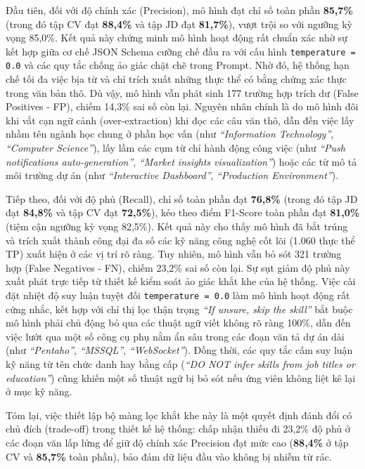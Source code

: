 Đầu tiên, đối với độ chính xác (Precision), mô hình đạt chỉ số toàn phần \textbf{85,7\%} (trong đó tập CV đạt \textbf{88,4\%} và tập JD đạt \textbf{81,7\%}), vượt trội so với ngưỡng kỳ vọng 85,0\%. Kết quả này chứng minh mô hình hoạt động rất chuẩn xác nhờ sự kết hợp giữa cơ chế JSON Schema cưỡng chế đầu ra với cấu hình \texttt{temperature = 0.0} và các quy tắc chống ảo giác chặt chẽ trong Prompt. Nhờ đó, hệ thống hạn chế tối đa việc bịa từ và chỉ trích xuất những thực thể có bằng chứng xác thực trong văn bản thô. Dù vậy, mô hình vẫn phát sinh 177 trường hợp trích dư (False Positives - FP), chiếm 14,3\% sai số còn lại. Nguyên nhân chính là do mô hình đôi khi vắt cạn ngữ cảnh (over-extraction) khi đọc các câu văn thô, dẫn đến việc lấy nhầm tên ngành học chung ở phần học vấn (như \textit{``Information Technology''}, \textit{``Computer Science''}), lấy lầm các cụm từ chỉ hành động công việc (như \textit{``Push notifications auto-generation''}, \textit{``Market insights visualization''}) hoặc các từ mô tả môi trường dự án (như \textit{``Interactive Dashboard''}, \textit{``Production Environment''}).

Tiếp theo, đối với độ phủ (Recall), chỉ số toàn phần đạt \textbf{76,8\%} (trong đó tập JD đạt \textbf{84,8\%} và tập CV đạt \textbf{72,5\%}), kéo theo điểm F1-Score toàn phần đạt \textbf{81,0\%} (tiệm cận ngưỡng kỳ vọng 82,5\%). Kết quả này cho thấy mô hình đã bắt trúng và trích xuất thành công đại đa số các kỹ năng công nghệ cốt lõi (1.060 thực thể TP) xuất hiện ở các vị trí rõ ràng. Tuy nhiên, mô hình vẫn bỏ sót 321 trường hợp (False Negatives - FN), chiếm 23,2\% sai số còn lại. Sự sụt giảm độ phủ này xuất phát trực tiếp từ thiết kế kiểm soát ảo giác khắt khe của hệ thống. Việc cài đặt nhiệt độ suy luận tuyệt đối \texttt{temperature = 0.0} làm mô hình hoạt động rất cứng nhắc, kết hợp với chỉ thị lọc thận trọng \textit{``If unsure, skip the skill''} bắt buộc mô hình phải chủ động bỏ qua các thuật ngữ viết không rõ ràng 100\%, dẫn đến việc lướt qua một số công cụ phụ nằm ẩn sâu trong các đoạn văn tả dự án dài (như \textit{``Pentaho''}, \textit{``MSSQL''}, \textit{``WebSocket''}). Đồng thời, các quy tắc cấm suy luận kỹ năng từ tên chức danh hay bằng cấp (\textit{``DO NOT infer skills from job titles or education''}) cũng khiến một số thuật ngữ bị bỏ sót nếu ứng viên không liệt kê lại ở mục kỹ năng.

Tóm lại, việc thiết lập bộ màng lọc khắt khe này là một quyết định đánh đổi có chủ đích (trade-off) trong thiết kế hệ thống: chấp nhận thiếu đi 23,2\% độ phủ ở các đoạn văn lấp lửng để giữ độ chính xác Precision đạt mức cao (\textbf{88,4\%} ở tập CV và \textbf{85,7\%} toàn phần), bảo đảm dữ liệu đầu vào không bị nhiễm từ rác.

